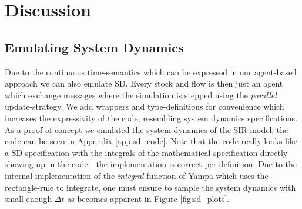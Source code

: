 \section{Discussion}

\subsection{Emulating System Dynamics}
Due to the continuous time-semantics which can be expressed in our agent-based approach we can also emulate SD. Every stock and flow is then just an agent which exchange messages where the simulation is stepped using the \textit{parallel} update-strategy. We add wrappers and type-definitions for convenience which increases the expressivity of the code, resembling system dynamics specifications. As a proof-of-concept we emulated the system dynamics of the SIR model, the code can be seen in Appendix \ref{app:sd_code}. Note that the code really looks like a SD specification with the integrals of the mathematical specification directly showing up in the code - the implementation is correct per definition. Due to the internal implementation of the \textit{integral} function of Yampa which uses the rectangle-rule to integrate, one must ensure to sample the system dynamics with small enough $\Delta t$ as becomes apparent in Figure \ref{fig:sd_plots}.

